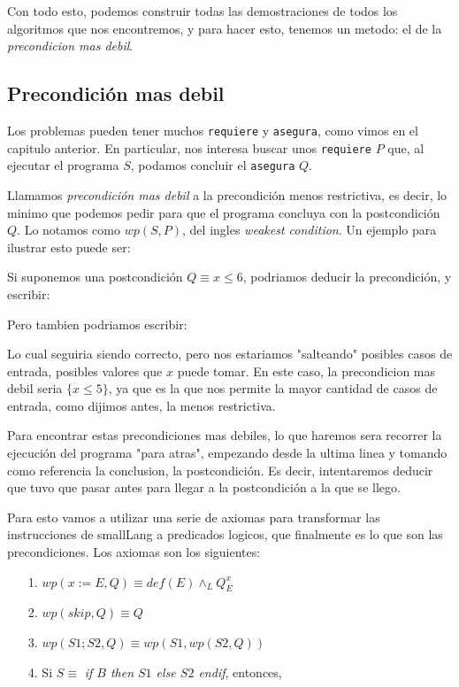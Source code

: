 \documentclass{article}
\begin{document}
Con todo esto, podemos construir todas las demostraciones de todos los algoritmos que nos encontremos, y para hacer esto, tenemos un metodo: el de la \textit{precondicion mas debil}.

\subsection{Precondición mas debil}

Los problemas pueden tener muchos \texttt{requiere} y \texttt{asegura}, como vimos en el capitulo anterior. En particular, nos interesa buscar unos \texttt{requiere} $P$ que, al ejecutar el programa $S$, podamos concluir el \texttt{asegura} $Q$.

Llamamos \textit{precondición mas debil} a la precondición menos restrictiva, es decir, lo minimo que podemos pedir para que el programa concluya con la postcondición $Q$. Lo notamos como $wp(S,P)$, del ingles \textit{weakest condition}. Un ejemplo para ilustrar esto puede ser: 


Si suponemos una postcondición $Q \equiv x \leq 6$, podriamos deducir la precondición, y escribir:


Pero tambien podriamos escribir:


Lo cual seguiria siendo correcto, pero nos estariamos "salteando" posibles casos de entrada, posibles valores que $x$ puede tomar. En este caso, la precondicion mas debil seria $\{ x \leq 5 \}$, ya que es la que nos permite la mayor cantidad de casos de entrada, como dijimos antes, la menos restrictiva.

Para encontrar estas precondiciones mas debiles, lo que haremos sera recorrer la ejecución del programa "para atras", empezando desde la ultima linea y tomando como referencia la conclusion, la postcondición. Es decir, intentaremos deducir que tuvo que pasar antes para llegar a la postcondición a la que se llego.

Para esto vamos a utilizar una serie de axiomas para transformar las instrucciones de smallLang a predicados logicos, que finalmente es lo que son las precondiciones. Los axiomas son los siguientes:

\begin{itemize}
	\item[1.] $wp(x := E, Q) \equiv def(E) \land_{L} Q_{E}^{x}$
	
	\item[2.] $wp(skip, Q) \equiv Q$
	
	\item[3.] $wp(S1;S2, Q) \equiv wp(S1, wp(S2, Q))$
	
	\item[4.] Si $S \equiv $ \textit{if $B$ then $S1$ else $S2$ endif}, entonces,

\end{itemize}
\end{document}
